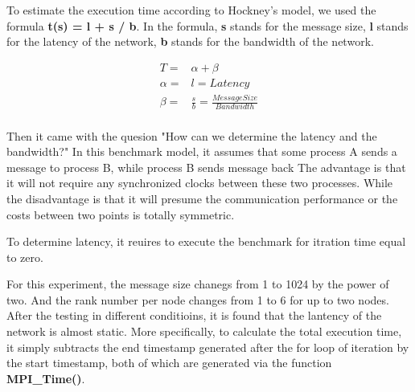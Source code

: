 
To estimate the execution time according to Hockney's model,
we used the formula \textbf{t(s) = l + s / b}. In the formula,
\textbf{s} stands for the message size,
\textbf{l} stands for the latency of the network,
\textbf{b} stands for the bandwidth of the network.

\begin{equation*}
    \begin{aligned}
    T = & \alpha + \beta \\
    \alpha = & l = Latency \\
    \beta = & \frac{s} {b} = \frac{Message Size} {Bandwidth}\\
    \end{aligned}
\end{equation*}

Then it came with the quesion "How can we determine the latency and the bandwidth?"
In this benchmark model, it assumes that some process A sends a message to process B, while process B sends message back
The advantage is that it will not require any synchronized clocks between these two processes.
While the disadvantage is that it will presume the communication performance or the costs between two points is totally symmetric.

To determine latency, it reuires to execute the benchmark for itration time equal to zero.

For this experiment, the message size chanegs from 1 to 1024 by the power of two.
And the rank number per node changes from 1 to 6 for up to two nodes.
After the testing in different conditioins, it is found that the lantency of the network is almost static.
More specifically, to calculate the total execution time,
it simply subtracts the end timestamp generated after the for loop of iteration
by the start timestamp, both of which are generated via the function \textbf{MPI\_Time()}.
